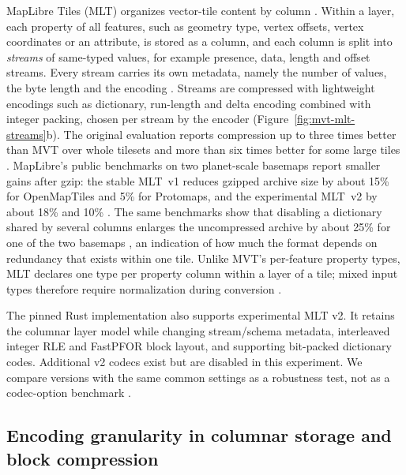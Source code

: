 MapLibre Tiles (MLT) organizes vector-tile content by column
\citep{tremmel2025mlt, maplibre_mlt_v1}. Within a layer, each property of all features,
such as geometry type, vertex offsets, vertex coordinates or an attribute, is stored as
a column, and each column is split into \emph{streams} of same-typed values, for example
presence, data, length and offset streams. Every stream carries its own metadata,
namely the number of values, the byte length and the encoding
\citep{maplibre_mlt_overview}. Streams are compressed with lightweight encodings such as
dictionary, run-length and delta encoding combined with integer packing, chosen per
stream by the encoder (Figure~\ref{fig:mvt-mlt-streams}b). The original evaluation reports
compression up to three times better than MVT over whole tilesets and more than six
times better for some large tiles \citep{tremmel2025mlt}. MapLibre's public benchmarks on
two planet-scale basemaps report smaller gains after gzip: the stable MLT~v1 reduces
gzipped archive size by about 15\% for OpenMapTiles and 5\% for Protomaps, and the
experimental MLT~v2 by about 18\% and 10\% \citep{maplibre_mlt_benchmarks}.
The same benchmarks show that disabling a dictionary shared by several columns enlarges
the uncompressed archive by about 25\% for one of the two basemaps \citep{maplibre_mlt_benchmarks},
an indication of how much the format depends on redundancy that exists within one tile.
Unlike MVT's per-feature property types, MLT declares one type per property column
within a layer of a tile; mixed input types therefore require normalization during
conversion \citep{maplibre_mlt_mvt_compat}.


The pinned Rust implementation also supports experimental MLT v2. It retains the
columnar layer model while changing stream/schema metadata, interleaved integer RLE
and FastPFOR block layout, and supporting bit-packed dictionary codes. Additional
v2 codecs exist but are disabled in this experiment. We compare versions with the
same common settings as a robustness test, not as a codec-option benchmark
\citep{maplibre_mlt_rust_pinned}.



\subsection{Encoding granularity in columnar storage and block compression}
\label{sec:bg-granularity}

